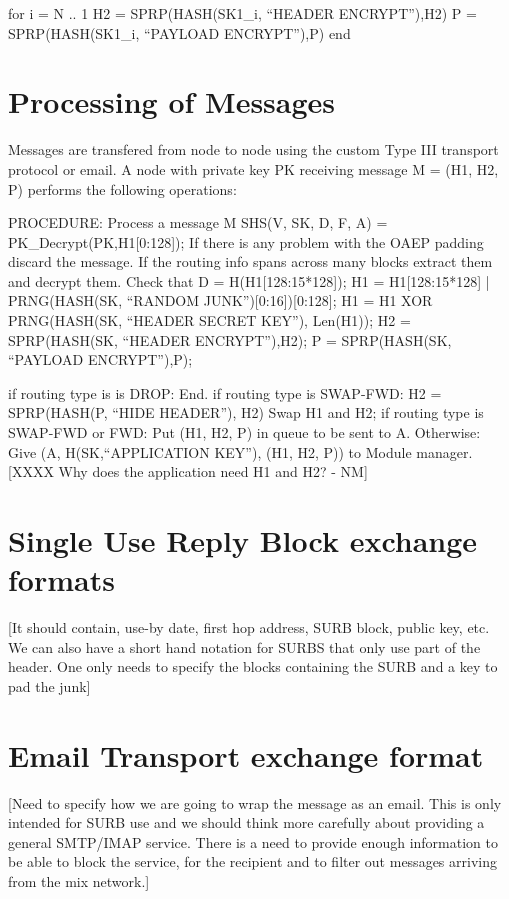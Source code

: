 	for i = N .. 1
		H2 = SPRP(HASH(SK1_i, ``HEADER ENCRYPT''),H2)
		P = SPRP(HASH(SK1_i, ``PAYLOAD ENCRYPT''),P)
	end

\section{Processing of Messages}

Messages are transfered from node to node using the custom Type III
transport protocol or email.  A node with private key PK receiving
message M = (H1, H2, P) performs the following operations:

PROCEDURE: Process a message M
	SHS(V, SK, D, F, A) = PK_Decrypt(PK,H1[0:128]);
	If there is any problem with the OAEP padding discard the message.
	If the routing info spans across many blocks extract them and
		decrypt them.
	Check that D = H(H1[128:15*128]);
	H1 = H1[128:15*128] | PRNG(HASH(SK, ``RANDOM
						JUNK'')[0:16])[0:128];
	H1 = H1 XOR PRNG(HASH(SK, ``HEADER SECRET KEY''), Len(H1));
	H2 = SPRP(HASH(SK, ``HEADER ENCRYPT''),H2);
	P = SPRP(HASH(SK, ``PAYLOAD ENCRYPT''),P);

	if routing type is is DROP:
                End.
	if routing type is SWAP-FWD:
		H2 = SPRP(HASH(P, ``HIDE HEADER''), H2)
		Swap H1 and H2;
        if routing type is SWAP-FWD or FWD:
	   	Put (H1, H2, P) in queue to be sent to A.
        Otherwise:
		Give (A, H(SK,``APPLICATION KEY''), (H1, H2, P)) to
		Module manager. 
                  [XXXX Why does the application need H1 and H2? - NM]

\section{Single Use Reply Block exchange formats}

[It should contain, use-by date, first hop address, 
 SURB block, public key, etc.
 We can also have a short hand notation for SURBS that only
 use part of the header. One only needs to specify the 
 blocks containing the SURB and a key to pad the junk]

\section{Email Transport exchange format}

[Need to specify how we are going to wrap the message
 as an email. This is only intended for SURB use and
 we should think more carefully about providing a 
 general SMTP/IMAP service.
 There is a need to provide enough information to be 
 able to block the service, for the recipient and to
 filter out messages arriving from the mix network.]

